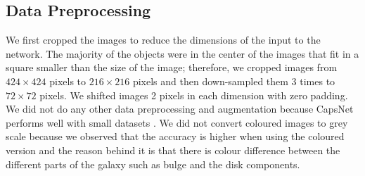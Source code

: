 \documentclass[a4paper,fleqn,usenatbib]{mnras}
\begin{document}
\subsection{Data Preprocessing}

We first cropped the images to reduce the dimensions of the input to the network. The majority of the objects were in the center of the images that fit in a square smaller than the size of the image; therefore, we cropped images from $424 \times 424$ pixels to $216 \times 216$ pixels and then down-sampled them 3 times to $72 \times 72$ pixels. We shifted images 2 pixels in each dimension with zero padding. We did not do any other data preprocessing and augmentation because CapsNet performs well with small datasets \citep{sabour2017dynamic}. We did not convert coloured images to grey scale because we observed that the accuracy is higher when using the coloured version and the reason behind it is that there is colour difference between the different parts of the galaxy such as bulge and the disk components. 
\end{document}
